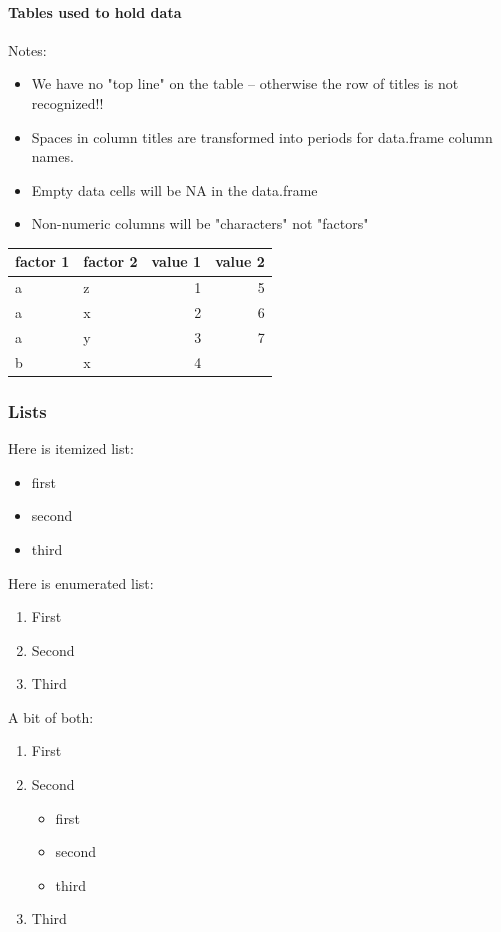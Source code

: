 \documentclass[11pt]{article}
\begin{document}
\paragraph{Tables used to hold data}
\label{sec:orge979270}

Notes:
\begin{itemize}
\item We have no "top line" on the table -- otherwise the row of titles is not recognized!!
\item Spaces in column titles are transformed into periods for data.frame column names.
\item Empty data cells will be NA in the data.frame
\item Non-numeric columns will be "characters" not "factors"
\end{itemize}

\begin{table}[htbp]
\label{tab:orgebb99e0}
\centering
\begin{tabular}{llrr}
factor 1 & factor 2 & value 1 & value 2\\
\hline
a & z & 1 & 5\\
a & x & 2 & 6\\
a & y & 3 & 7\\
b & x & 4 & \\
\end{tabular}
\end{table}

\subsubsection{Lists}
\label{sec:org4485e62}

Here is itemized list:

\begin{itemize}
\item first
\item second
\item third
\end{itemize}

Here is enumerated list:

\begin{enumerate}
\item First
\item Second
\item Third
\end{enumerate}

A bit of both:

\begin{enumerate}
\item First
\item Second
\begin{itemize}
\item first
\item second
\item third
\end{itemize}
\item Third
\end{enumerate}
\end{document}
